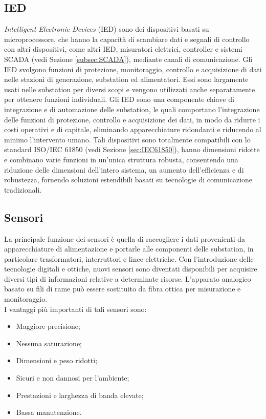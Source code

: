 \subsection{IED}
\emph{Intelligent Electronic Devices} (IED) sono dei dispositivi basati su microprocessore, che hanno la capacità di scambiare dati e segnali di controllo con altri dispositivi, come altri IED, misuratori elettrici, controller e sistemi SCADA (vedi Sezione \ref{subsec:SCADA}), mediante canali di comunicazione. Gli IED svolgono funzioni di protezione, monitoraggio, controllo e acquisizione di dati nelle stazioni di generazione, substation ed alimentatori. Essi sono largamente usati nelle substation per diversi scopi e vengono utilizzati anche separatamente per ottenere funzioni individuali. Gli IED sono una componente chiave di integrazione e di automazione delle substation, le quali comportano l'integrazione delle funzioni di protezione, controllo e acquisizione dei dati, in modo da ridurre i costi operativi e di capitale, eliminando apparecchiature ridondanti e riducendo al minimo l'intervento umano. Tali dispositivi sono totalmente compatibili con lo standard ISO/IEC 61850 (vedi Sezione \ref{sec:IEC61850}), hanno dimensioni ridotte e combinano varie funzioni in un'unica struttura robusta, consentendo una riduzione delle dimensioni dell'intero sistema, un aumento dell'efficienza e di robustezza, fornendo soluzioni estendibili basati su tecnologie di comunicazione tradizionali. 

\subsection{Sensori}
La principale funzione dei sensori è quella di raccogliere i dati provenienti da apparecchiature di alimentazione e portarle alle componenti delle substation, in particolare trasformatori, interruttori e linee elettriche. Con l'introduzione delle tecnologie digitali e ottiche, nuovi sensori sono diventati disponibili per acquisire diversi tipi di informazioni relative a determinate risorse. L'apparato analogico basato su fili di rame può essere sostituito da fibra ottica per misurazione e monitoraggio.
\\
I vantaggi più importanti di tali sensori sono:
\begin{itemize}
	\item Maggiore precisione;
	\item Nessuna saturazione;
	\item Dimensioni e peso ridotti;
	\item Sicuri e non dannosi per l'ambiente;
	\item Prestazioni e larghezza di banda elevate;
	\item Bassa manutenzione.
\end{itemize}


